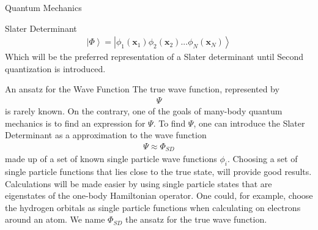\documentclass[twoside,english]{uiofysmaster}
\begin{document}
\begin{chapter}{Quantum Mechanics}
\begin{section}{Slater Determinant}
		\begin{align}
			\left| \Phi \right > = \left| \phi_1(\mathbf{x}_1) \phi_2(\mathbf{x}_2) ... \phi_N({\mathbf{x}_N}) \right>  
		\end{align}
		Which will be the preferred representation of a Slater determinant until Second quantization is introduced. 
	\end{section}

	\begin{section}{An ansatz for the Wave Function}
		The true wave function, represented by
		\begin{align}
			\Psi
		\end{align}
		is rarely known. On the contrary, one of the goals of many-body quantum mechanics is to find an expression for $\Psi $. To find $\Psi$, one can introduce the Slater Determinant as a approximation to the wave function 
		\begin{align}
			\Psi \approx \Phi_{SD}
		\end{align}
		made up of a set of known single particle wave functions $\phi_i$. Choosing a set of single particle functions that lies close to the true state, will provide good results. Calculations will be made easier by using single particle states that are eigenstates of the one-body Hamiltonian operator. One could, for example, choose the hydrogen orbitals as single particle functions when calculating on electrons around an atom. We name $\Phi_{SD}$ the ansatz for the true wave function. 
	\end{section}


\end{chapter}
\end{document}
